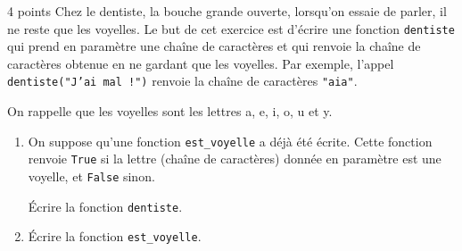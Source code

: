 \documentclass[a4paper,dvipsnames]{article}
\begin{document}
\medskip

\begin{exercice}{4 points}{}
  Chez le dentiste, la bouche grande ouverte, lorsqu'on essaie de parler, il ne reste que les voyelles. Le but de cet exercice est d'écrire une fonction \texttt{dentiste} qui prend en paramètre une chaîne de caractères et qui renvoie la chaîne de caractères obtenue en ne gardant que les voyelles. Par exemple, l'appel \texttt{dentiste("J'ai mal !")} renvoie la chaîne de caractères \texttt{"aia"}.

  \medskip

  \textdbend{} On rappelle que les voyelles sont les lettres a, e, i, o, u et y.

  \begin{enumerate}
    \item On suppose qu'une fonction \texttt{est_voyelle} a déjà été écrite. Cette fonction renvoie \texttt{True} si la lettre (chaîne de caractères) donnée en paramètre est une voyelle, et \texttt{False} sinon.

      Écrire la fonction \texttt{dentiste}.
    \item Écrire la fonction \texttt{est_voyelle}.
  \end{enumerate}
\end{exercice}

\medskip
\end{document}
